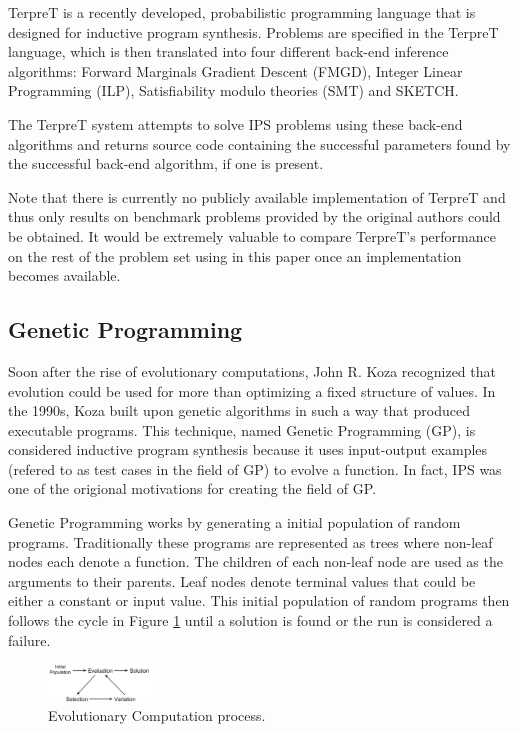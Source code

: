 TerpreT is a recently developed, probabilistic programming language that is designed for inductive program synthesis. Problems are specified in the TerpreT language, which is then translated into four different back-end inference algorithms: Forward Marginals Gradient Descent (FMGD), Integer Linear Programming (ILP), Satisfiability modulo theories (SMT) and SKETCH.

The TerpreT system attempts to solve IPS problems using these back-end algorithms and returns source code containing the successful parameters found by the successful back-end algorithm, if one is present.

Note that there is currently no publicly available implementation of TerpreT and thus only results on benchmark problems provided by the original authors could be obtained. It would be extremely valuable to compare TerpreT's performance on the rest of the problem set using in this paper once an implementation becomes available.

\subsection{Genetic Programming}

Soon after the rise of evolutionary computations, John R. Koza recognized that evolution could be used for more than optimizing a fixed structure of values. In the 1990s, Koza built upon genetic algorithms in such a way that produced executable programs. This technique, named Genetic Programming (GP), is considered inductive program synthesis because it uses input-output examples (refered to as test cases in the field of GP) to evolve a function. In fact, IPS was one of the origional motivations for creating the field of GP\cite{Koza1992}. 

Genetic Programming works by generating a initial population of random programs. Traditionally these programs are represented as trees where non-leaf nodes each denote a function. The children of each non-leaf node are used as the arguments to their parents. Leaf nodes denote terminal values that could be either a constant or input value. This initial population of random programs then follows the cycle in Figure \ref{fig:evo}  until a solution is found or the run is considered a failure.

\begin{figure}[t]
\centering
\includegraphics[width=0.25\textwidth]{res/EvolutionCycle}
\caption{Evolutionary Computation process.}
\label{fig:evo}
\end{figure}

